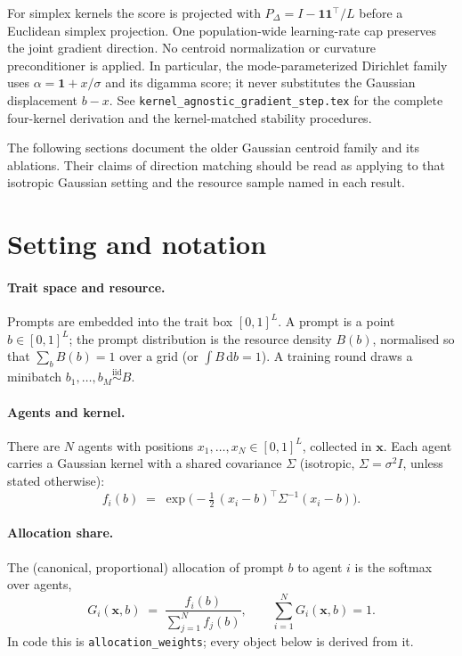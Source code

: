 \documentclass[11pt]{article}
\theoremstyle{remark}
\newcommand{\bx}{\mathbf{x}}
\newcommand{\Sig}{\Sigma}
\newcommand{\dd}{\,\mathrm{d}}
\newcommand{\cfg}[1]{\texttt{#1}}
\begin{document}
For simplex kernels the score is projected with
$P_\Delta=I-\mathbf1\mathbf1^\top/L$ before a Euclidean simplex projection.
One population-wide learning-rate cap preserves the joint gradient direction.
No centroid normalization or curvature preconditioner is applied.  In
particular, the mode-parameterized Dirichlet family uses
$\alpha=\mathbf1+x/\sigma$ and its digamma score; it never substitutes the
Gaussian displacement $b-x$.  See
\cfg{kernel\_agnostic\_gradient\_step.tex} for the complete four-kernel
derivation and the kernel-matched stability procedures.

The following sections document the older Gaussian centroid family and its
ablations.  Their claims of direction matching should be read as applying to
that isotropic Gaussian setting and the resource sample named in each result.

\section{Setting and notation}

\paragraph{Trait space and resource.}
Prompts are embedded into the trait box $[0,1]^L$. A prompt is a point
$b\in[0,1]^L$; the prompt distribution is the resource density $B(b)$,
normalised so that $\sum_b B(b)=1$ over a grid (or $\int B\dd b=1$). A training
round draws a minibatch $b_1,\dots,b_M \stackrel{\text{iid}}{\sim} B$.

\paragraph{Agents and kernel.}
There are $N$ agents with positions $x_1,\dots,x_N\in[0,1]^L$, collected in
$\bx$. Each agent carries a Gaussian kernel with a shared covariance $\Sig$
(isotropic, $\Sig=\sigma^2 I$, unless stated otherwise):
\begin{equation}
  f_i(b) \;=\; \exp\!\Big(-\tfrac12\,(x_i-b)^{\!\top}\Sig^{-1}(x_i-b)\Big).
  \label{eq:kernel}
\end{equation}

\paragraph{Allocation share.}
The (canonical, proportional) allocation of prompt $b$ to agent $i$ is the
softmax over agents,
\begin{equation}
  G_i(\bx,b) \;=\; \frac{f_i(b)}{\sum_{j=1}^N f_j(b)},
  \qquad \sum_{i=1}^N G_i(\bx,b)=1 .
  \label{eq:G}
\end{equation}
In code this is \texttt{allocation\_weights}; every object below is derived
from it.
\end{document}
